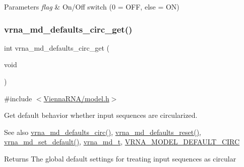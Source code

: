 \begin{DoxyParams}{Parameters}
{\em flag} & On/\+Off switch (0 = O\+FF, else = ON) \\
\hline
\end{DoxyParams}
\mbox{\label{group__model__details_gad3a7e58de344ad93a08925f58f94f6fb}} 
\subsubsection{\texorpdfstring{vrna\_md\_defaults\_circ\_get()}{vrna\_md\_defaults\_circ\_get()}}
{\footnotesize\ttfamily int vrna\+\_\+md\+\_\+defaults\+\_\+circ\+\_\+get (\begin{DoxyParamCaption}\item[{void}]{ }\end{DoxyParamCaption})}



{\ttfamily \#include $<$\mbox{\hyperlink{model_8h}{Vienna\+R\+N\+A/model.\+h}}$>$}



Get default behavior whether input sequences are circularized. 

\begin{DoxySeeAlso}{See also}
\mbox{\hyperlink{group__model__details_ga4e1deb3e91a8a99e5c6dd905a5eb0186}{vrna\+\_\+md\+\_\+defaults\+\_\+circ()}}, \mbox{\hyperlink{group__model__details_ga70834424cf804d149937de89f80ceb45}{vrna\+\_\+md\+\_\+defaults\+\_\+reset()}}, \mbox{\hyperlink{group__model__details_ga8ac6ff84936282436f822644bf841f66}{vrna\+\_\+md\+\_\+set\+\_\+default()}}, \mbox{\hyperlink{group__model__details_ga1f8a10e12a0a1915f2a4eff0b28ea17c}{vrna\+\_\+md\+\_\+t}}, \mbox{\hyperlink{group__model__details_ga22059033db7bcd875c51fec32425490a}{V\+R\+N\+A\+\_\+\+M\+O\+D\+E\+L\+\_\+\+D\+E\+F\+A\+U\+L\+T\+\_\+\+C\+I\+RC}} 
\end{DoxySeeAlso}
\begin{DoxyReturn}{Returns}
The global default settings for treating input sequences as circular 
\end{DoxyReturn}
\mbox{\label{group__model__details_ga0685ca2aeb39af76f2421fc308163dce}} 
